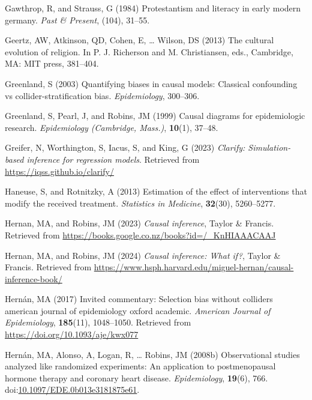 \documentclass[
  single column]{article}
\newlength{\cslhangindent}
\newenvironment{CSLReferences}[2] %
 {\begin{list}{}{%
  \setlength{\itemindent}{0pt}
  \setlength{\leftmargin}{0pt}
  \setlength{\parsep}{0pt}
  \ifodd #1
   \setlength{\leftmargin}{\cslhangindent}
   \setlength{\itemindent}{-1\cslhangindent}
  \fi
  \setlength{\itemsep}{#2\baselineskip}}}
 {\end{list}}
\begin{document}
\begin{CSLReferences}{1}{0}
Gawthrop, R, and Strauss, G (1984) Protestantism and literacy in early
modern germany. \emph{Past \& Present}, (104), 31--55.

Geertz, AW, Atkinson, QD, Cohen, E, \ldots{} Wilson, DS (2013) The
cultural evolution of religion. In P. J. Richerson and M. Christiansen,
eds., Cambridge, MA: MIT press, 381--404.

Greenland, S (2003) Quantifying biases in causal models: Classical
confounding vs collider-stratification bias. \emph{Epidemiology},
300--306.

Greenland, S, Pearl, J, and Robins, JM (1999) Causal diagrams for
epidemiologic research. \emph{Epidemiology (Cambridge, Mass.)},
\textbf{10}(1), 37--48.

Greifer, N, Worthington, S, Iacus, S, and King, G (2023) \emph{Clarify:
Simulation-based inference for regression models}. Retrieved from
\url{https://iqss.github.io/clarify/}

Haneuse, S, and Rotnitzky, A (2013) Estimation of the effect of
interventions that modify the received treatment. \emph{Statistics in
Medicine}, \textbf{32}(30), 5260--5277.

Hernan, MA, and Robins, JM (2023) \emph{Causal inference}, Taylor \&
Francis. Retrieved from
\url{https://books.google.co.nz/books?id=/_KnHIAAACAAJ}

Hernan, MA, and Robins, JM (2024) \emph{Causal inference: What if?},
Taylor \& Francis. Retrieved from
\url{https://www.hsph.harvard.edu/miguel-hernan/causal-inference-book/}

Hernán, MA (2017) Invited commentary: Selection bias without colliders
\textbar{} american journal of epidemiology \textbar{} oxford academic.
\emph{American Journal of Epidemiology}, \textbf{185}(11), 1048--1050.
Retrieved from \url{https://doi.org/10.1093/aje/kwx077}

Hernán, MA, Alonso, A, Logan, R, \ldots{} Robins, JM (2008b)
Observational studies analyzed like randomized experiments: An
application to postmenopausal hormone therapy and coronary heart
disease. \emph{Epidemiology}, \textbf{19}(6), 766.
doi:\href{https://doi.org/10.1097/EDE.0b013e3181875e61}{10.1097/EDE.0b013e3181875e61}.


\end{CSLReferences}
\end{document}
